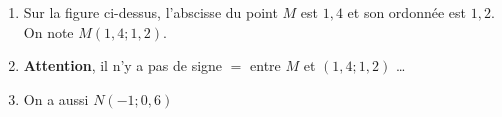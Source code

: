 
\begin{enumerate}
\item Sur la figure ci-dessus, l'abscisse du point $M$ est $1,4$ et son ordonnée est $1,2$. On note $M\left(1,4;1,2\right)$.
\item \textbf{Attention}, il n'y a pas de signe $=$ entre $M$ et $\left(1,4;1,2\right)$ \ldots{}
\item On a aussi $N\left(-1;0,6\right)$
\end{enumerate}

